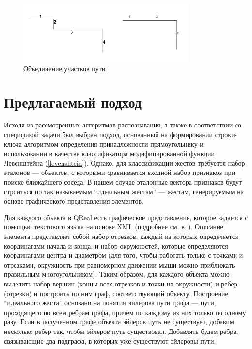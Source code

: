\documentclass[a5paper]{article}
\begin{document}
\begin{figure} [ht]
  \begin{center}
    \includegraphics[width=0.8\textwidth, bb=0 0 500 200]{04-qt.png}
    \caption{Объединение участков пути}
    \label{qt}
  \end{center}
\end{figure}

\section{Предлагаемый подход}
\label{rectAlgorithm}
Исходя из рассмотренных алгоритмов распознавания, а также в соответствии со спецификой задачи был выбран подход, основанный на формировании строки-ключа алгоритмом определения принадлежности прямоугольнику и использовании в качестве классификатора модифицированной функции Левенштейна (\ref{levenshtein}). Однако, для классификации жестов требуется набор эталонов --- объектов, с которыми сравнивается входной набор признаков при поиске ближайшего соседа. В нашем случае эталонные вектора признаков будут строиться по так называемым ``идеальным жестам'' --- жестам, генерируемым на основе графического представления элементов. 

Для каждого объекта в QReal есть графическое представление, которое задается с помощью текстового языка на основе XML (подробнее см. в~\cite{qreal}). Описание элемента представляет собой набор отрезков, каждый из которых определяется координатами начала и конца, и набор окружностей, которые определяются координатами центра и диаметром (для того, чтобы работать только с точками и отрезками, окружность при равномерном движении мыши можно приближать правильным многоугольником). Таким образом, для каждого объекта можно выделить набор вершин (концы всех отрезков и точки на окружности) и ребер (отрезки) и построить по ним граф, соответствующий объекту. Построение ``идеального жеста'' основано на понятии эйлерова пути графа --- пути, проходящего по всем ребрам графа, причем по каждому из них только по одному разу. Если в полученном графе объекта эйлеров путь не существует, добавим несколько ребер так, чтобы эйлеров путь существовал. Добавлять будем ребра, связывающие два подграфа, в которых уже существуют эйлеровы пути.
\end{document}
